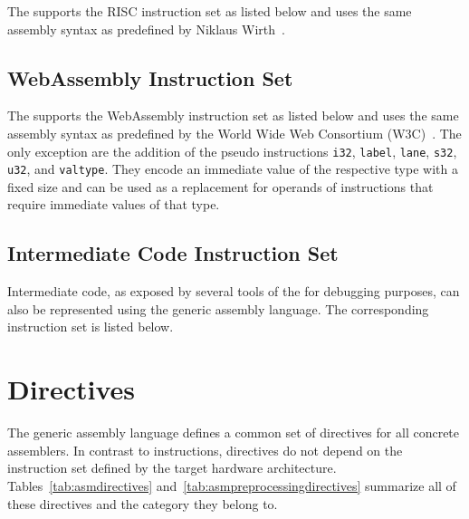 The \ecs{} supports the RISC instruction set as listed below and uses the same assembly syntax as predefined by Niklaus Wirth~\cite{risc:instructionset}.
\seerisc


\subsection{WebAssembly Instruction Set}

The \ecs{} supports the WebAssembly instruction set as listed below and uses the same assembly syntax as predefined by the World Wide Web Consortium (W3C)~\cite{wasm:instructionset}.
The only exception are the addition of the pseudo instructions \texttt{i32}, \texttt{label}, \texttt{lane}, \texttt{s32}, \texttt{u32}, and \texttt{valtype}.
They encode an immediate value of the respective type with a fixed size and can be used as a replacement for operands of instructions that require immediate values of that type.
\seewasm


\subsection{Intermediate Code Instruction Set}

Intermediate code, as exposed by several tools of the \ecs{} for debugging purposes, can also be represented using the generic assembly language.
The corresponding instruction set is listed below.
\seecode


\section{Directives}\label{sec:asmdirectives}

The generic assembly language defines a common set of directives for all concrete assemblers.
In contrast to instructions, directives do not depend on the instruction set defined by the target hardware architecture.
Tables~\ref{tab:asmdirectives} and~\ref{tab:asmpreprocessingdirectives} summarize all of these directives and the category they belong to.

\newcommand{\asmdirectiveref}[2]{& \texttt{#1#2} & \ref{sec:asm#2} \\}

